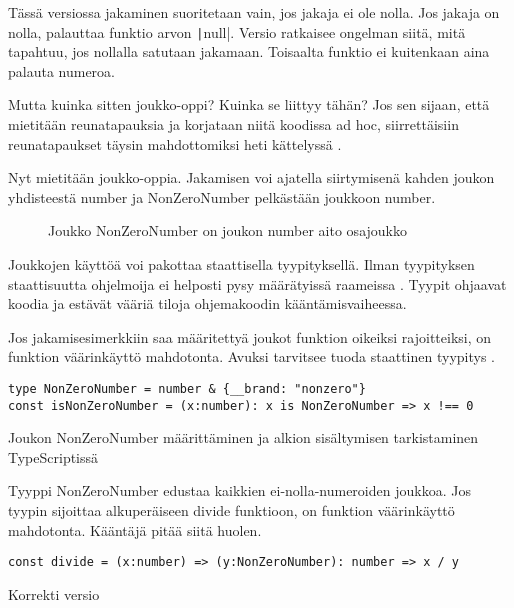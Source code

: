 Tässä versiossa jakaminen suoritetaan vain, jos jakaja ei ole nolla. Jos jakaja on nolla, palauttaa funktio arvon \texttt|null|. Versio ratkaisee ongelman siitä, mitä tapahtuu, jos nollalla satutaan jakamaan. Toisaalta funktio ei kuitenkaan aina palauta numeroa.

Mutta kuinka sitten joukko-oppi? Kuinka se liittyy tähän? Jos sen sijaan, että mietitään reunatapauksia ja korjataan niitä koodissa ad hoc, siirrettäisiin reunatapaukset täysin mahdottomiksi heti kättelyssä \cite{impossiblebetter}.

Nyt mietitään joukko-oppia. Jakamisen voi ajatella siirtymisenä kahden joukon yhdisteestä number ja NonZeroNumber pelkästään joukkoon number.

\begin{figure}[ht]
    \centering
    \caption{Joukko NonZeroNumber on joukon number aito osajoukko}
    \label{fig:set-esimerkki}
\end{figure}

Joukkojen käyttöä voi pakottaa staattisella tyypityksellä. Ilman tyypityksen staattisuutta ohjelmoija ei helposti pysy määrätyissä raameissa \cite[44]{cantarella_fp_haitat}. Tyypit ohjaavat koodia ja estävät vääriä tiloja ohjemakoodin kääntämisvaiheessa.

Jos jakamisesimerkkiin saa määritettyä joukot funktion oikeiksi rajoitteiksi, on funktion väärinkäyttö mahdotonta. Avuksi tarvitsee tuoda staattinen tyypitys   \cite{typsecript_website}.

\begin{code}
    \begin{verbatim}
type NonZeroNumber = number & {__brand: "nonzero"}
const isNonZeroNumber = (x:number): x is NonZeroNumber => x !== 0
\end{verbatim}
    \label{code:ts_set_theory_5}
    \caption{Joukon NonZeroNumber määrittäminen ja alkion sisältymisen tarkistaminen TypeScriptissä}
\end{code}

Tyyppi NonZeroNumber edustaa kaikkien ei-nolla-numeroiden joukkoa. Jos tyypin sijoittaa alkuperäiseen divide funktioon, on funktion väärinkäyttö mahdotonta. Kääntäjä pitää siitä huolen.


\begin{code}
    \begin{verbatim}
const divide = (x:number) => (y:NonZeroNumber): number => x / y
\end{verbatim}
    \caption{Korrekti versio}
    \label{code:ts_set_theory_6}
\end{code}

